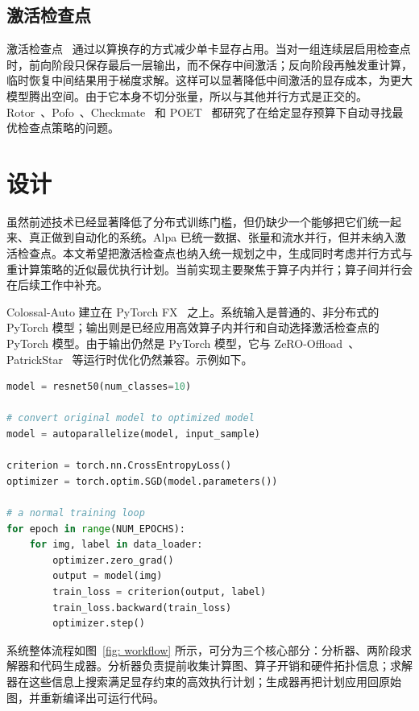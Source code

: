 \documentclass[10pt,letterpaper,twocolumn]{article}
\begin{document}
\subsection{激活检查点}

激活检查点~\cite{act-ckpt, dtr} 通过以算换存的方式减少单卡显存占用。当对一组连续层启用检查点时，前向阶段只保存最后一层输出，而不保存中间激活；反向阶段再触发重计算，临时恢复中间结果用于梯度求解。这样可以显著降低中间激活的显存成本，为更大模型腾出空间。由于它本身不切分张量，所以与其他并行方式是正交的。Rotor~\cite{herrmann2019optimal}、Pofo~\cite{beaumont2021efficient}、Checkmate~\cite{jain2020checkmate} 和 POET~\cite{patil2022poet} 都研究了在给定显存预算下自动寻找最优检查点策略的问题。

\section{设计}

虽然前述技术已经显著降低了分布式训练门槛，但仍缺少一个能够把它们统一起来、真正做到自动化的系统。Alpa 已统一数据、张量和流水并行，但并未纳入激活检查点。本文希望把激活检查点也纳入统一规划之中，生成同时考虑并行方式与重计算策略的近似最优执行计划。当前实现主要聚焦于算子内并行；算子间并行会在后续工作中补充。

Colossal-Auto 建立在 PyTorch FX~\cite{torch-fx} 之上。系统输入是普通的、非分布式的 PyTorch 模型；输出则是已经应用高效算子内并行和自动选择激活检查点的 PyTorch 模型。由于输出仍然是 PyTorch 模型，它与 ZeRO-Offload~\cite{ren2021zero}、PatrickStar~\cite{fang2022parallel, huang2022elixir} 等运行时优化仍然兼容。示例如下。

\begin{lstlisting}[language=Python, label=demo, caption=用户只需极小改动即可接入系统的示例。]
model = resnet50(num_classes=10)

# convert original model to optimized model
model = autoparallelize(model, input_sample)

criterion = torch.nn.CrossEntropyLoss()
optimizer = torch.optim.SGD(model.parameters())

# a normal training loop
for epoch in range(NUM_EPOCHS):
    for img, label in data_loader:
        optimizer.zero_grad()
        output = model(img)
        train_loss = criterion(output, label)
        train_loss.backward(train_loss)
        optimizer.step()
\end{lstlisting}

系统整体流程如图~\ref{fig: workflow} 所示，可分为三个核心部分：分析器、两阶段求解器和代码生成器。分析器负责提前收集计算图、算子开销和硬件拓扑信息；求解器在这些信息上搜索满足显存约束的高效执行计划；生成器再把计划应用回原始图，并重新编译出可运行代码。
\end{document}
